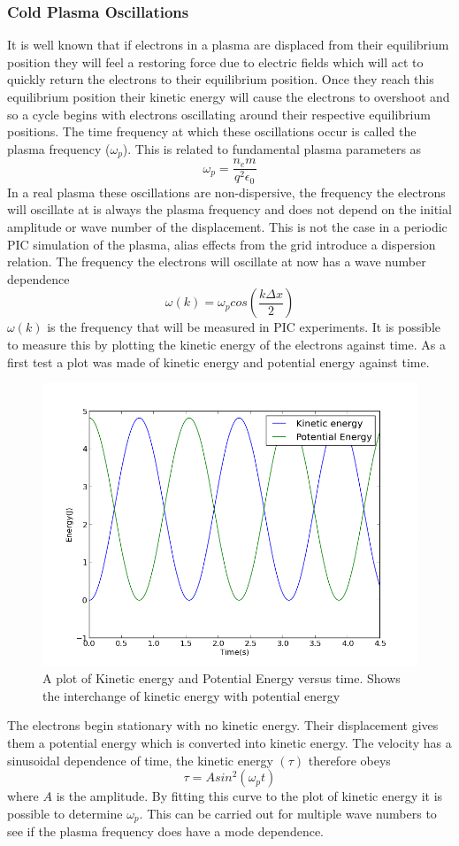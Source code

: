 \documentclass[12pt]{article}
\def\be{\begin{equation}}
\def\ee{\end{equation}}
\begin{document}
\subsubsection{Cold Plasma Oscillations} 
It is well known that if electrons in a plasma are displaced from their equilibrium position they will feel a restoring force due to electric fields which will act to quickly return the electrons to their equilibrium position. Once they reach this equilibrium position their kinetic energy will cause the electrons to overshoot and so a cycle begins with electrons oscillating around their respective equilibrium positions. The time frequency at which these oscillations occur is called the plasma frequency ($\omega_p$). This is related to fundamental plasma parameters as 
\be 
\omega_p = \frac{n_e m}{q^2 \epsilon_0} 
\ee
In a real plasma these oscillations are non-dispersive, the frequency the electrons will oscillate at is always the plasma frequency and does not depend on the initial amplitude or wave number of the displacement. This is not the case in a periodic PIC simulation of the plasma, alias effects from the grid introduce a dispersion relation. The frequency the electrons will oscillate at now has a wave number dependence \cite{bible}
\be 
\omega(k) = \omega_p cos\left(\frac{k \Delta x }{2} \right) 
\ee
$\omega(k)$ is the frequency that will be measured in PIC experiments. It is possible to measure this by plotting the kinetic energy of the electrons against time. As a first test a plot was made of kinetic energy and potential energy against time.
\begin{figure}[H]
\centering
\includegraphics[height=0.5\textwidth]{keandpe.png}
\caption{A plot of Kinetic energy and Potential Energy versus time. Shows the interchange of kinetic energy with potential energy}
\end{figure}
The electrons begin stationary with no kinetic energy. Their displacement gives them a potential energy which is converted into kinetic energy. The velocity has a sinusoidal dependence of time, the kinetic energy $(\tau)$ therefore obeys 
\be 
\tau = Asin^2(\omega_p t)
\ee
where $A$ is the amplitude. By fitting this curve to the plot of kinetic energy it is possible to determine 
$\omega_p$. This can be carried out for multiple wave numbers to see if the plasma frequency does have a  mode dependence. 
\end{document}
